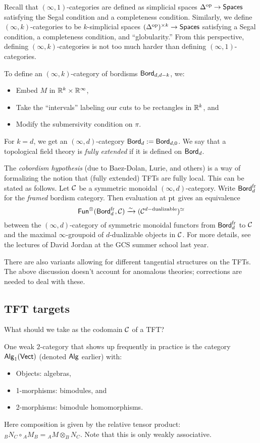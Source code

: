 Recall that $(\infty, 1)$-categories are defined as simplicial spaces $\Delta^{\mathrm{op}} \to \mathsf{Spaces}$ satisfying the Segal condition and a completeness condition.
Similarly, we define $(\infty, k)$-categories to be $k$-simplicial spaces $(\Delta^{\mathrm{op}})^{\times k} \to \mathsf{Spaces}$ satisfying a Segal condition, a completeness condition, and ``globularity.''
From this perspective, defining $(\infty, k)$-categories is not too much harder than defining $(\infty, 1)$-categories.

To define an $(\infty, k)$-category of bordisms $\mathsf{Bord}_{d,d-k}$, we:
\begin{itemize}
	\item Embed $M$ in $\mathbb{R}^k \times \mathbb{R}^\infty$,
	\item Take the ``intervals'' labeling our cuts to be rectangles in $\mathbb{R}^k$, and
	\item Modify the submersivity condition on $\pi$.
\end{itemize}

For $k = d$, we get an $(\infty, d)$-category $\mathsf{Bord}_d := \mathsf{Bord}_{d,0}$.
We say that a topological field theory is \emph{fully extended} if it is defined on $\mathsf{Bord}_d$.

The \emph{cobordism hypothesis} (due to Baez-Dolan, Lurie, and others) is a way of formalizing the notion that (fully extended) TFTs are fully local.
This can be stated as follows.
Let $\mathcal{C}$ be a symmetric monoidal $(\infty, d)$-category.
Write $\mathsf{Bord}_d^{\mathrm{fr}}$ for the \emph{framed} bordism category.
Then evaluation at $\operatorname{pt}$ gives an equivalence
\[
	\mathsf{Fun}^\otimes(\mathsf{Bord}_d^{\mathrm{fr}}, \mathcal{C}) \xrightarrow{\sim} (\mathcal{C}^{d\mathrm{-dualizable}})^{\simeq}
\]
between the $(\infty, d)$-category of symmetric monoidal functors from $\mathsf{Bord}_d^{\mathrm{fr}}$ to $\mathcal{C}$ and the maximal $\infty$-groupoid of $d$-dualizable objects in $\mathcal{C}$.
For more details, see the lectures of David Jordan at the GCS summer school last year.

There are also variants allowing for different tangential structures on the TFTs.
The above discussion doesn't account for anomalous theories; corrections are needed to deal with these.

\subsection{TFT targets}

What should we take as the codomain $\mathcal{C}$ of a TFT?

\begin{ex}
	One weak $2$-category that shows up frequently in practice is the category $\mathsf{Alg}_1(\mathsf{Vect})$ (denoted $\mathsf{Alg}$ earlier) with:
	\begin{itemize}
		\item Objects: algebras,
		\item 1-morphisms: bimodules, and
		\item 2-morphisms: bimodule homomorphisms.
	\end{itemize}
	Here composition is given by the relative tensor product: ${}_B N_C \circ {}_A M_B = {}_A M \otimes_B N_C$.
	Note that this is only weakly associative.
\end{ex}

